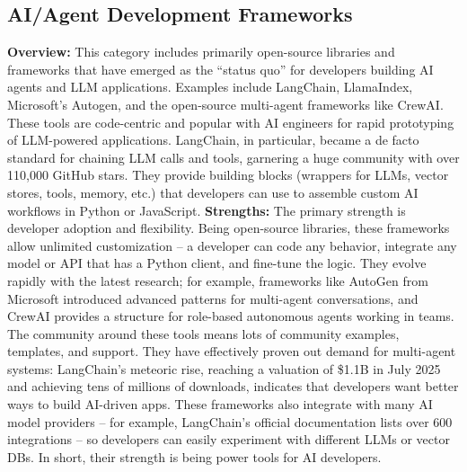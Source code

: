 \subsection{AI/Agent Development Frameworks}
\textbf{Overview:} This category includes primarily open-source libraries and frameworks that have emerged as the “status quo” for developers building AI agents and LLM applications. Examples include LangChain, LlamaIndex, Microsoft's Autogen, and the open-source multi-agent frameworks like CrewAI. These tools are code-centric and popular with AI engineers for rapid prototyping of LLM-powered applications. LangChain, in particular, became a de facto standard for chaining LLM calls and tools, garnering a huge community with over 110,000 GitHub stars\cite{langchainGitHub}. They provide building blocks (wrappers for LLMs, vector stores, tools, memory, etc.) that developers can use to assemble custom AI workflows in Python or JavaScript.
\newline\newline
\textbf{Strengths:} The primary strength is developer adoption and flexibility. Being open-source libraries, these frameworks allow unlimited customization – a developer can code any behavior, integrate any model or API that has a Python client, and fine-tune the logic. They evolve rapidly with the latest research; for example, frameworks like AutoGen from Microsoft introduced advanced patterns for multi-agent conversations\cite{autogenGitHub}, and CrewAI provides a structure for role-based autonomous agents working in teams\cite{crewaiGitHub}. The community around these tools means lots of community examples, templates, and support. They have effectively proven out demand for multi-agent systems: LangChain's meteoric rise, reaching a valuation of \$1.1B in July 2025\cite{langchainValuation} and achieving tens of millions of downloads, indicates that developers want better ways to build AI-driven apps. These frameworks also integrate with many AI model providers – for example, LangChain's official documentation lists over 600 integrations\cite{langchainIntegrations} – so developers can easily experiment with different LLMs or vector DBs. In short, their strength is being power tools for AI developers.
\newline\newline
